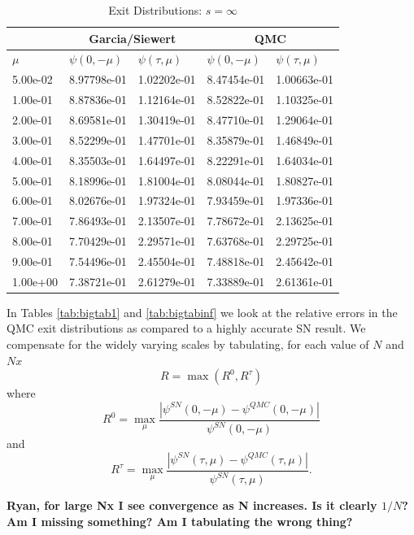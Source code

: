 \begin{table}[h]
\centering
\caption{Exit Distributions: $s = \infty$}
\label{tab:cesinf}
\begin{tabular}{lllll}
 & \multicolumn{2}{c}{Garcia/Siewert}
 & \multicolumn{2}{c}{QMC}\\
\hline
$\mu$ &$\psi(0, -\mu)$ &$\psi(\tau, \mu)$ &$\psi(0, -\mu)$ &$\psi(\tau, \mu)$ \\
\hline
5.00e-02 &  8.97798e-01 &  1.02202e-01 &  8.47454e-01 &  1.00663e-01   \\
1.00e-01 &  8.87836e-01 &  1.12164e-01 &  8.52822e-01 &  1.10325e-01   \\
2.00e-01 &  8.69581e-01 &  1.30419e-01 &  8.47710e-01 &  1.29064e-01   \\
3.00e-01 &  8.52299e-01 &  1.47701e-01 &  8.35879e-01 &  1.46849e-01   \\
4.00e-01 &  8.35503e-01 &  1.64497e-01 &  8.22291e-01 &  1.64034e-01   \\
5.00e-01 &  8.18996e-01 &  1.81004e-01 &  8.08044e-01 &  1.80827e-01   \\
6.00e-01 &  8.02676e-01 &  1.97324e-01 &  7.93459e-01 &  1.97336e-01   \\
7.00e-01 &  7.86493e-01 &  2.13507e-01 &  7.78672e-01 &  2.13625e-01   \\
8.00e-01 &  7.70429e-01 &  2.29571e-01 &  7.63768e-01 &  2.29725e-01   \\
9.00e-01 &  7.54496e-01 &  2.45504e-01 &  7.48818e-01 &  2.45642e-01   \\
1.00e+00 &  7.38721e-01 &  2.61279e-01 &  7.33889e-01 &  2.61361e-01   \\
\hline
\end{tabular}
\end{table}

In Tables \ref{tab:bigtab1} and \ref{tab:bigtabinf} we look at the
relative errors in the QMC exit distributions as compared to a highly
accurate SN result. We compensate for the widely varying scales by tabulating,
for each value of $N$ and $Nx$
\[
R = \max(R^0, R^\tau)
\]
where
\[
R^0 = \max_\mu
\frac{ | \psi^{SN}(0,-\mu) - \psi^{QMC}(0,-\mu) | }{\psi^{SN}(0,-\mu) }
\]
and
\[
R^\tau = \max_\mu
\frac{ | \psi^{SN}(\tau,\mu) - \psi^{QMC}(\tau,\mu) | }{\psi^{SN}(\tau,\mu) }.
\]

{\bf Ryan, for large Nx I see convergence as N increases. Is it clearly
$1/N$? Am I missing something? Am I tabulating the wrong thing?}

